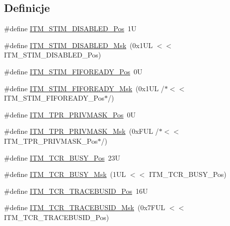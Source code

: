 \subsection*{Definicje}
\begin{DoxyCompactItemize}
\item 
\#define \hyperlink{group___c_m_s_i_s___i_t_m_gafd9ed85f36233685f182cc249621e025}{I\+T\+M\+\_\+\+S\+T\+I\+M\+\_\+\+D\+I\+S\+A\+B\+L\+E\+D\+\_\+\+Pos}~1U
\item 
\#define \hyperlink{group___c_m_s_i_s___i_t_m_ga9d8f821bdad48c7b4a02f11ebf2c8852}{I\+T\+M\+\_\+\+S\+T\+I\+M\+\_\+\+D\+I\+S\+A\+B\+L\+E\+D\+\_\+\+Msk}~(0x1\+U\+L $<$$<$ I\+T\+M\+\_\+\+S\+T\+I\+M\+\_\+\+D\+I\+S\+A\+B\+L\+E\+D\+\_\+\+Pos)
\item 
\#define \hyperlink{group___c_m_s_i_s___i_t_m_gaa79f3a59d15d810d48d924c0ca4ae0b9}{I\+T\+M\+\_\+\+S\+T\+I\+M\+\_\+\+F\+I\+F\+O\+R\+E\+A\+D\+Y\+\_\+\+Pos}~0U
\item 
\#define \hyperlink{group___c_m_s_i_s___i_t_m_ga73dc88e3338b4ef9a81e53a1d2c5ae83}{I\+T\+M\+\_\+\+S\+T\+I\+M\+\_\+\+F\+I\+F\+O\+R\+E\+A\+D\+Y\+\_\+\+Msk}~(0x1\+U\+L /$\ast$$<$$<$ I\+T\+M\+\_\+\+S\+T\+I\+M\+\_\+\+F\+I\+F\+O\+R\+E\+A\+D\+Y\+\_\+\+Pos$\ast$/)
\item 
\#define \hyperlink{group___c_m_s_i_s___i_t_m_ga7abe5e590d1611599df87a1884a352e8}{I\+T\+M\+\_\+\+T\+P\+R\+\_\+\+P\+R\+I\+V\+M\+A\+S\+K\+\_\+\+Pos}~0U
\item 
\#define \hyperlink{group___c_m_s_i_s___i_t_m_ga168e089d882df325a387aab3a802a46b}{I\+T\+M\+\_\+\+T\+P\+R\+\_\+\+P\+R\+I\+V\+M\+A\+S\+K\+\_\+\+Msk}~(0x\+F\+U\+L /$\ast$$<$$<$ I\+T\+M\+\_\+\+T\+P\+R\+\_\+\+P\+R\+I\+V\+M\+A\+S\+K\+\_\+\+Pos$\ast$/)
\item 
\#define \hyperlink{group___c_m_s_i_s___i_t_m_ga9174ad4a36052c377cef4e6aba2ed484}{I\+T\+M\+\_\+\+T\+C\+R\+\_\+\+B\+U\+S\+Y\+\_\+\+Pos}~23U
\item 
\#define \hyperlink{group___c_m_s_i_s___i_t_m_ga43ad7cf33de12f2ef3a412d4f354c60f}{I\+T\+M\+\_\+\+T\+C\+R\+\_\+\+B\+U\+S\+Y\+\_\+\+Msk}~(1\+U\+L $<$$<$ I\+T\+M\+\_\+\+T\+C\+R\+\_\+\+B\+U\+S\+Y\+\_\+\+Pos)
\item 
\#define \hyperlink{group___c_m_s_i_s___i_t_m_ga113bf41ed31584360ad7d865e5e0ace7}{I\+T\+M\+\_\+\+T\+C\+R\+\_\+\+T\+R\+A\+C\+E\+B\+U\+S\+I\+D\+\_\+\+Pos}~16U
\item 
\#define \hyperlink{group___c_m_s_i_s___i_t_m_gac014c7345304ed245b642eb9d6e9a302}{I\+T\+M\+\_\+\+T\+C\+R\+\_\+\+T\+R\+A\+C\+E\+B\+U\+S\+I\+D\+\_\+\+Msk}~(0x7\+F\+U\+L $<$$<$ I\+T\+M\+\_\+\+T\+C\+R\+\_\+\+T\+R\+A\+C\+E\+B\+U\+S\+I\+D\+\_\+\+Pos)
$$
\end{DoxyCompactItemize}
